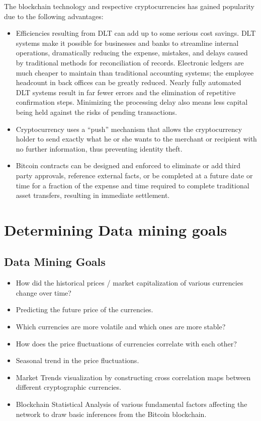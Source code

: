 \documentclass{article}
\begin{document}
The blockchain technology and respective cryptocurrencies has gained popularity due to the following advantages:
\begin{itemize}
    \item Efficiencies resulting from DLT can add up to some serious cost savings. DLT systems make it possible for businesses and banks to streamline internal operations, dramatically reducing the expense, mistakes, and delays caused by traditional methods for reconciliation of records. Electronic ledgers are much cheaper to maintain than traditional accounting systems; the employee headcount in back offices can be greatly reduced. Nearly fully automated DLT systems result in far fewer errors and the elimination of repetitive confirmation steps. Minimizing the processing delay also means less capital being held against the risks of pending transactions.
    
    \item Cryptocurrency uses a “push” mechanism that allows the cryptocurrency holder to send exactly what he or she wants to the merchant or recipient with no further information, thus preventing identity theft.
    
    \item Bitcoin contracts can be designed and enforced to eliminate or add third party approvals, reference external facts, or be completed at a future date or time for a fraction of the expense and time required to complete traditional asset transfers, resulting in immediate settlement.
\end{itemize}

\section{Determining Data mining goals}
\subsection{Data Mining Goals}
\begin{itemize}
\item How did the historical prices / market capitalization of various currencies change over time?
\item Predicting the future price of the currencies.
\item Which currencies are more volatile and which ones are more stable?
\item How does the price fluctuations of currencies correlate with each other?
\item Seasonal trend in the price fluctuations.
\item Market Trends visualization by constructing cross correlation maps between different cryptographic currencies. 
\item Blockchain Statistical Analysis of various fundamental factors affecting the network to draw basic inferences from the Bitcoin blockchain.
\end{itemize}
\end{document}
